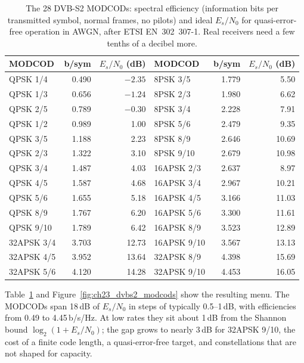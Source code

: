 \begin{table}[htbp]\centering\small
\caption{The 28 DVB-S2 MODCODs: spectral efficiency (information bits per transmitted symbol,
normal frames, no pilots) and ideal $E_s/N_0$ for quasi-error-free operation in AWGN, after ETSI
EN~302~307-1. Real receivers need a few tenths of a decibel more.}\label{tab:ch23:dvbs2}
\begin{tabular}{@{}l r r @{\hspace{2.2em}} l r r@{}}
\toprule
MODCOD & b/sym & $E_s/N_0$ (dB) & MODCOD & b/sym & $E_s/N_0$ (dB)\\
\midrule
QPSK 1/4 & 0.490 & $-2.35$ & 8PSK 3/5 & 1.779 & 5.50\\
QPSK 1/3 & 0.656 & $-1.24$ & 8PSK 2/3 & 1.980 & 6.62\\
QPSK 2/5 & 0.789 & $-0.30$ & 8PSK 3/4 & 2.228 & 7.91\\
QPSK 1/2 & 0.989 & 1.00 & 8PSK 5/6 & 2.479 & 9.35\\
QPSK 3/5 & 1.188 & 2.23 & 8PSK 8/9 & 2.646 & 10.69\\
QPSK 2/3 & 1.322 & 3.10 & 8PSK 9/10 & 2.679 & 10.98\\
QPSK 3/4 & 1.487 & 4.03 & 16APSK 2/3 & 2.637 & 8.97\\
QPSK 4/5 & 1.587 & 4.68 & 16APSK 3/4 & 2.967 & 10.21\\
QPSK 5/6 & 1.655 & 5.18 & 16APSK 4/5 & 3.166 & 11.03\\
QPSK 8/9 & 1.767 & 6.20 & 16APSK 5/6 & 3.300 & 11.61\\
QPSK 9/10 & 1.789 & 6.42 & 16APSK 8/9 & 3.523 & 12.89\\
32APSK 3/4 & 3.703 & 12.73 & 16APSK 9/10 & 3.567 & 13.13\\
32APSK 4/5 & 3.952 & 13.64 & 32APSK 8/9 & 4.398 & 15.69\\
32APSK 5/6 & 4.120 & 14.28 & 32APSK 9/10 & 4.453 & 16.05\\
\bottomrule
\end{tabular}
\end{table}

Table~\ref{tab:ch23:dvbs2} and Figure~\ref{fig:ch23_dvbs2_modcods} show the resulting menu. The
MODCODs span 18\,dB of $E_s/N_0$ in steps of typically 0.5--1\,dB, with efficiencies from 0.49 to
4.45\,b/s/Hz. At low rates they sit about 1\,dB from the Shannon bound $\log_2(1+E_s/N_0)$; the
gap grows to nearly 3\,dB for 32APSK 9/10, the cost of a finite code length, a quasi-error-free
target, and constellations that are not shaped for capacity.


